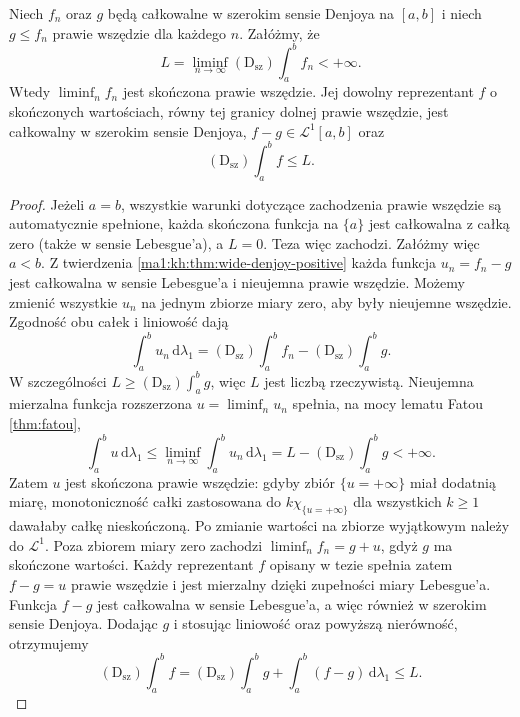 \begin{twierdzenie}
\label{it:thm:wide-denjoy-fatou}
Niech $f_n$ oraz $g$ będą całkowalne w szerokim sensie
Denjoya na $[a,b]$ i niech $g\le f_n$ prawie wszędzie
dla każdego $n$. Załóżmy, że
\[
 L=\liminf_{n\to\infty}(\mathrm D_{\mathrm{sz}})\int_a^b f_n
 <+\infty.
\]
Wtedy $\liminf_n f_n$ jest skończona prawie wszędzie.
Jej dowolny reprezentant $f$ o skończonych wartościach,
równy tej granicy dolnej prawie wszędzie, jest całkowalny
w szerokim sensie Denjoya, $f-g\in\mathcal L^1[a,b]$ oraz
\[
 (\mathrm D_{\mathrm{sz}})\int_a^b f\le L.
\]
\end{twierdzenie}
\begin{proof}
Jeżeli $a=b$, wszystkie warunki dotyczące zachodzenia
prawie wszędzie są automatycznie spełnione, każda
skończona funkcja na $\{a\}$ jest całkowalna z całką
zero (także w sensie Lebesgue'a), a $L=0$. Teza więc
zachodzi. Załóżmy więc $a<b$.
Z twierdzenia \ref{ma1:kh:thm:wide-denjoy-positive} każda
funkcja $u_n=f_n-g$ jest całkowalna w sensie Lebesgue'a
i nieujemna prawie wszędzie. Możemy zmienić wszystkie
$u_n$ na jednym zbiorze miary zero, aby były nieujemne
wszędzie. Zgodność obu całek i liniowość dają
\[
 \int_a^b u_n\,\mathrm d\lambda_1
 =(\mathrm D_{\mathrm{sz}})\int_a^b f_n
  -(\mathrm D_{\mathrm{sz}})\int_a^b g .
\]
W szczególności $L\ge(\mathrm D_{\mathrm{sz}})\int_a^b g$,
więc $L$ jest liczbą rzeczywistą.
Nieujemna mierzalna funkcja rozszerzona $u=\liminf_n u_n$
spełnia, na mocy lematu Fatou \ref{thm:fatou},
\[
 \int_a^b u\,\mathrm d\lambda_1
 \le \liminf_{n\to\infty}\int_a^b u_n\,\mathrm d\lambda_1
 =L-(\mathrm D_{\mathrm{sz}})\int_a^b g<+\infty.
\]
Zatem $u$ jest skończona prawie wszędzie: gdyby zbiór $\{u=+\infty\}$ miał dodatnią miarę, monotoniczność całki zastosowana do $k\chi_{\{u=+\infty\}}$ dla wszystkich $k\ge1$ dawałaby całkę nieskończoną. Po zmianie
wartości na zbiorze wyjątkowym należy do $\mathcal L^1$.
Poza zbiorem miary zero zachodzi
$\liminf_n f_n=g+u$, gdyż $g$ ma skończone wartości.
Każdy reprezentant $f$ opisany w tezie spełnia zatem
$f-g=u$ prawie wszędzie i jest mierzalny dzięki zupełności
miary Lebesgue'a. Funkcja $f-g$ jest całkowalna w sensie
Lebesgue'a, a więc również w szerokim sensie Denjoya.
Dodając $g$ i stosując liniowość oraz powyższą nierówność,
otrzymujemy
\[
 (\mathrm D_{\mathrm{sz}})\int_a^b f
 =(\mathrm D_{\mathrm{sz}})\int_a^b g
  +\int_a^b (f-g)\,\mathrm d\lambda_1\le L.
\]
\end{proof}
